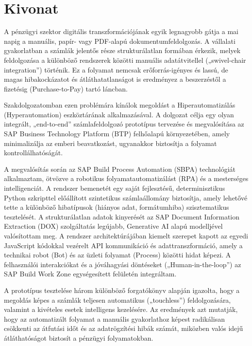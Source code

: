 \setcounter{page}{1}

\selecthungarian

\chapter*{Kivonat}

A pénzügyi szektor digitális transzformációjának egyik legnagyobb gátja a mai napig a manuális, papír- vagy PDF-alapú dokumentumfeldolgozás. A vállalati gyakorlatban a számlák jelentős része strukturálatlan formában érkezik, melyek feldolgozása a különböző rendszerek közötti manuális adatátvitellel („swivel-chair integration”) történik. Ez a folyamat nemcsak erőforrás-igényes és lassú, de magas hibakockázatot és átláthatatlanságot is eredményez a beszerzéstől a fizetésig (Purchase-to-Pay) tartó láncban.

Szakdolgozatomban ezen problémára kínálok megoldást a Hiperautomatizálás (Hyperautomation) eszköztárának alkalmazásával. A dolgozat célja egy olyan integrált, „end-to-end” számlafeldolgozó prototípus tervezése és megvalósítása az SAP Business Technology Platform (BTP) felhőalapú környezetében, amely minimalizálja az emberi beavatkozást, ugyanakkor biztosítja a folyamat kontrollálhatóságát.

A megvalósítás során az SAP Build Process Automation (SBPA) technológiát alkalmaztam, ötvözve a robotikus folyamatautomatizálást (RPA) és a mesterséges intelligenciát. A rendszer bemenetét egy saját fejlesztésű, determinisztikus Python szkripttel előállított szintetikus számlaállomány biztosítja, amely lehetővé tette a különböző hibatípusok (hiányos adat, formátumhiba) szisztematikus tesztelését. A strukturálatlan adatok kinyerését az SAP Document Information Extraction (DOX) szolgáltatás legújabb, Generative AI alapú modelljével valósítottam meg. A rendszer architektúrájában kiemelt szerepet kapott az egyedi JavaScript kódokkal vezérelt API kommunikáció és adattranszformáció, amely a technikai robot (Bot) és az üzleti folyamat (Process) közötti hidat képezi. A felhasználói interakciókat és a jóváhagyási döntéseket („Human-in-the-loop”) az SAP Build Work Zone egységesített felületén integráltam.

A prototípus tesztelése három különböző forgatókönyv alapján igazolta, hogy a megoldás képes a számlák teljesen automatikus („touchless”) feldolgozására, valamint a kivételes esetek intelligens kezelésére. Az eredmények azt mutatják, hogy az automatizált folyamat a manuális gyakorlathoz képest radikálisan csökkenti az átfutási időt és az adatrögzítési hibák számát, miközben valós idejű átláthatóságot biztosít a pénzügyi folyamatokban.

